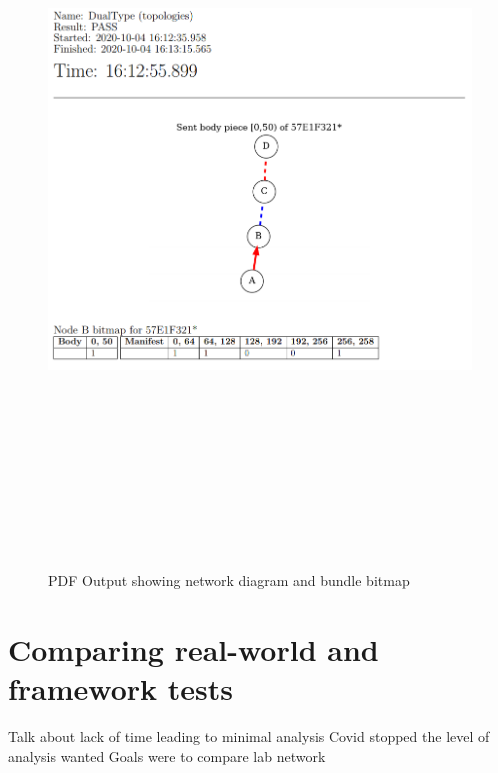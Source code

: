 \begin{figure}
    \begin{centering}
        \includegraphics[width=15cm,height=20cm,keepaspectratio]{Figures/Chapter6-PDFPartition.png}
        \caption{PDF Output showing network diagram and bundle bitmap}
        \label{fig:chapter6PDFPartition}
    \end{centering}
\end{figure}

\section{Comparing real-world and framework tests}
Talk about lack of time leading to minimal analysis
Covid stopped the level of analysis wanted
Goals were to compare lab network


